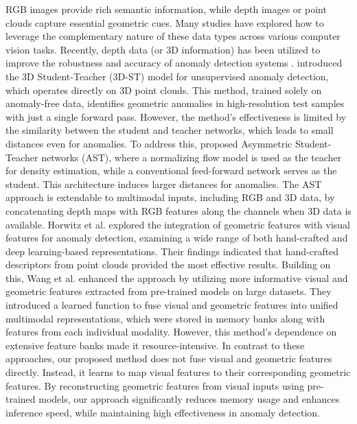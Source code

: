 RGB images provide rich semantic information, while depth images or point clouds capture essential geometric cues. Many studies have explored how to leverage the complementary nature of these data types across various computer vision tasks. Recently, depth data (or 3D information) has been utilized to improve the robustness and accuracy of anomaly detection systems \cite{horwitz2022empirical, wang2023multimodal}. \cite{bergmann2023anomaly} introduced the 3D Student-Teacher (3D-ST) model for unsupervised anomaly detection, which operates directly on 3D point clouds. This method, trained solely on anomaly-free data, identifies geometric anomalies in high-resolution test samples with just a single forward pass. However, the method's effectiveness is limited by the similarity between the student and teacher networks, which leads to small distances even for anomalies. To address this, \cite{rudolph2023asymmetric} proposed Asymmetric Student-Teacher networks (AST), where a normalizing flow model is used as the teacher for density estimation, while a conventional feed-forward network serves as the student. This architecture induces larger distances for anomalies. The AST approach is extendable to multimodal inputs, including RGB and 3D data, by concatenating depth maps with RGB features along the channels when 3D data is available. Horwitz et al. \cite{horwitz2023back} explored the integration of geometric features with visual features for anomaly detection, examining a wide range of both hand-crafted and deep learning-based representations. Their findings indicated that hand-crafted descriptors from point clouds provided the most effective results. Building on this, Wang et al. \cite{wang2023multimodal} enhanced the approach by utilizing more informative visual and geometric features extracted from pre-trained models on large datasets. They introduced a learned function to fuse visual and geometric features into unified multimodal representations, which were stored in memory banks along with features from each individual modality. However, this method's dependence on extensive feature banks made it resource-intensive. In contrast to these approaches, our proposed method does not fuse visual and geometric features directly. Instead, it learns to map visual features to their corresponding geometric features. By reconstructing geometric features from visual inputs using pre-trained models, our approach significantly reduces memory usage and enhances inference speed, while maintaining high effectiveness in anomaly detection.